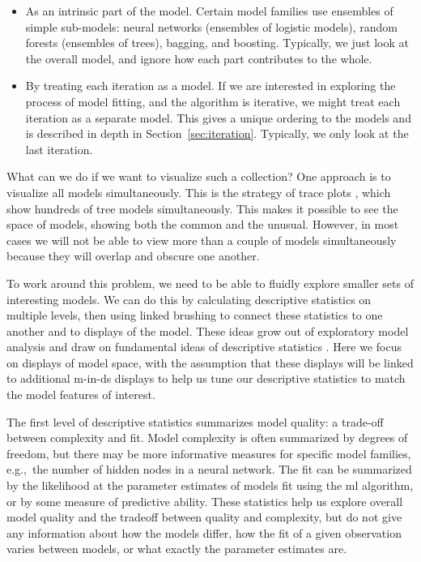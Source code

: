 \documentclass[preprint]{imsart}
\begin{document}
\begin{itemize}
  \item As an intrinsic part of the model.  Certain model families use ensembles of simple sub-models: neural networks (ensembles of logistic models), random forests (ensembles of trees), bagging, and boosting. Typically, we just look at the overall model, and ignore how each part contributes to the whole.

  \item By treating each iteration as a model.  If we are interested in exploring the process of model fitting, and the algorithm is iterative, we might treat each iteration as a separate model.  This gives a unique ordering to the models and is described in depth in Section~\ref{sec:iteration}.  Typically, we only look at the last iteration.

\end{itemize}

What can we do if we want to visualize such a collection? One approach is to visualize all models simultaneously. This is the strategy of trace plots \citep{urbanek:2005}, which show hundreds of tree models simultaneously. This makes it possible to see the space of models, showing both the common and the unusual. However, in most cases we will not be able to view more than a couple of models simultaneously because they will overlap and obscure one another.

To work around this problem, we need to be able to fluidly explore smaller sets of interesting models. We can do this by calculating descriptive statistics on multiple levels, then using linked brushing to connect these statistics to one another and to displays of the model. These ideas grow out of exploratory model analysis \citep{unwin:2003aa,urbanek:2004} and draw on fundamental ideas of descriptive statistics \citep{bickel:1975a,bickel:1975b}. Here we focus on displays of model space, with the assumption that these displays will be linked to additional m-in-ds displays to help us tune our descriptive statistics to match the model features of interest.

The first level of descriptive statistics summarizes model quality: a trade-off between complexity and fit. Model complexity is often summarized by degrees of freedom, but there may be more informative measures for specific model families, e.g.,\ the number of hidden nodes in a neural network. The fit can be summarized by the likelihood at the parameter estimates of models fit using the {\sc ml} algorithm, or by some measure of predictive ability. These statistics help us explore overall model quality and the tradeoff between quality and complexity, but do not give any information about how the models differ, how the fit of a given observation varies between models, or what exactly the parameter estimates are.
\end{document}
